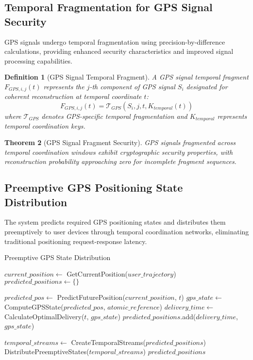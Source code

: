 \documentclass[12pt,a4paper]{article}
\newtheorem{theorem}{Theorem}[section]
\newtheorem{definition}[theorem]{Definition}
\begin{document}
\subsection{Temporal Fragmentation for GPS Signal Security}

GPS signals undergo temporal fragmentation using precision-by-difference calculations, providing enhanced security characteristics and improved signal processing capabilities.

\begin{definition}[GPS Signal Temporal Fragment]
A GPS signal temporal fragment $F_{GPS,i,j}(t)$ represents the $j$-th component of GPS signal $S_i$ designated for coherent reconstruction at temporal coordinate $t$:
\begin{equation}
F_{GPS,i,j}(t) = \mathcal{T}_{GPS}(S_i, j, t, K_{temporal}(t))
\end{equation}
where $\mathcal{T}_{GPS}$ denotes GPS-specific temporal fragmentation and $K_{temporal}$ represents temporal coordination keys.
\end{definition}

\begin{theorem}[GPS Signal Fragment Security]
GPS signals fragmented across temporal coordination windows exhibit cryptographic security properties, with reconstruction probability approaching zero for incomplete fragment sequences.
\end{theorem}

\subsection{Preemptive GPS Positioning State Distribution}

The system predicts required GPS positioning states and distributes them preemptively to user devices through temporal coordination networks, eliminating traditional positioning request-response latency.

\begin{algorithm}
\caption{Preemptive GPS State Distribution}
\begin{algorithmic}[1]
    \State $current\_position \gets$ GetCurrentPosition($user\_trajectory$)
    \State $predicted\_positions \gets \{\}$
    
        \State $predicted\_pos \gets$ PredictFuturePosition($current\_position$, $t$)
        \State $gps\_state \gets$ ComputeGPSState($predicted\_pos$, $atomic\_reference$)
        \State $delivery\_time \gets$ CalculateOptimalDelivery($t$, $gps\_state$)
        \State $predicted\_positions$.add($delivery\_time$, $gps\_state$)
    \EndFor
    
    \State $temporal\_streams \gets$ CreateTemporalStreams($predicted\_positions$)
    \State DistributePreemptiveStates($temporal\_streams$)
    \State \Return $predicted\_positions$
\EndProcedure
\end{algorithmic}
\end{algorithm}
\end{document}
